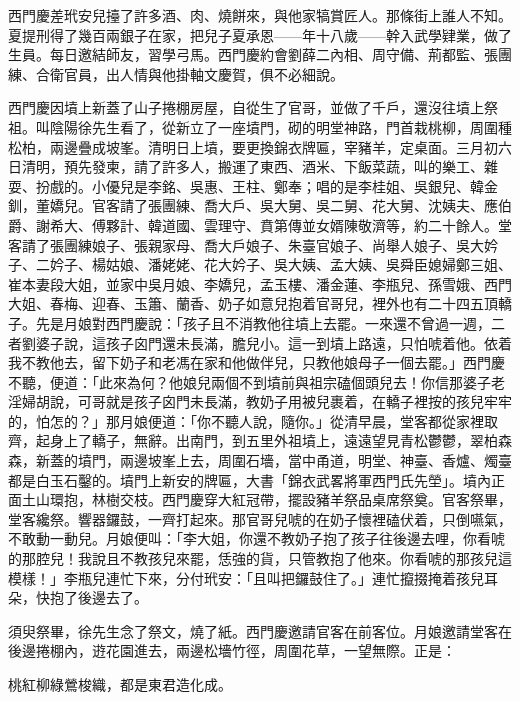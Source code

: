 西門慶差玳安兒擡了許多酒、肉、燒餅來，與他家犒賞匠人。那條街上誰人不知。夏提刑得了幾百兩銀子在家，把兒子夏承恩——年十八歲——幹入武學肄業，做了生員。{}每日邀結師友，習學弓馬。西門慶約會劉薛二內相、周守備、荊都監、張團練、合衛官員，出人情與他掛軸文慶賀，俱不必細說。

西門慶因墳上新蓋了山子捲棚房屋，自從生了官哥，並做了千戶，還沒往墳上祭祖。叫陰陽徐先生看了，從新立了一座墳門，砌的明堂神路，門首栽桃柳，周圍種松柏，兩邊疊成坡峯。清明日上墳，要更換錦衣牌匾，宰豬羊，定桌面。三月初六日清明，預先發柬，請了許多人，搬運了東西、酒米、下飯菜蔬，叫的樂工、雜耍、扮戲的。小優兒是李銘、吳惠、王柱、鄭奉；唱的是李桂姐、吳銀兒、韓金釧，董嬌兒。官客請了張團練、喬大戶、吳大舅、吳二舅、花大舅、沈姨夫、應伯爵、謝希大、傅夥計、韓道國、雲理守、賁第傳並女婿陳敬濟等，約二十餘人。堂客請了張團練娘子、張親家母、喬大戶娘子、朱臺官娘子、尚舉人娘子、吳大妗子、二妗子、楊姑娘、潘姥姥、花大妗子、吳大姨、孟大姨、吳舜臣媳婦鄭三姐、崔本妻段大姐，並家中吳月娘、李嬌兒，孟玉樓、潘金蓮、李瓶兒、孫雪娥、西門大姐、春梅、迎春、玉簫、蘭香、奶子如意兒抱着官哥兒，裡外也有二十四五頂轎子。先是月娘對西門慶說：「孩子且不消教他往墳上去罷。一來還不曾過一週，二者劉婆子說，這孩子囟門還未長滿，膽兒小。這一到墳上路遠，只怕唬着他。{}依着我不教他去，留下奶子和老馮在家和他做伴兒，只教他娘母子一個去罷。」西門慶不聽，便道：「此來為何？他娘兒兩個不到墳前與祖宗磕個頭兒去！你信那婆子老淫婦胡說，可哥就是孩子囟門未長滿，教奶子用被兒裹着，在轎子裡按的孩兒牢牢的，怕怎的？」那月娘便道：「你不聽人說，隨你。」從清早晨，堂客都從家裡取齊，起身上了轎子，無辭。出南門，到五里外祖墳上，遠遠望見青松鬱鬱，翠柏森森，新蓋的墳門，兩邊坡峯上去，周圍石墻，當中甬道，明堂、神臺、香爐、燭臺都是白玉石鑿的。墳門上新安的牌匾，大書「錦衣武畧將軍西門氏先塋」。墳內正面土山環抱，林樹交枝。西門慶穿大紅冠帶，擺設豬羊祭品桌席祭奠。官客祭畢，堂客纔祭。響器鑼鼓，一齊打起來。那官哥兒唬的在奶子懷裡磕伏着，只倒嚥氣，不敢動一動兒。月娘便叫：「李大姐，你還不教奶子抱了孩子往後邊去哩，你看唬的那腔兒！{}我說且不教孩兒來罷，恁強的貨，只管教抱了他來。你看唬的那孩兒這模樣！」李瓶兒連忙下來，分付玳安：「且叫把鑼鼓住了。」連忙攛掇掩着孩兒耳朵，快抱了後邊去了。

須臾祭畢，徐先生念了祭文，燒了紙。西門慶邀請官客在前客位。月娘邀請堂客在後邊捲棚內，逰花園進去，兩邊松墻竹徑，周圍花草，一望無際。正是：

\begin{myquote}
桃紅柳綠鶯梭織，都是東君造化成。
\end{myquote}

